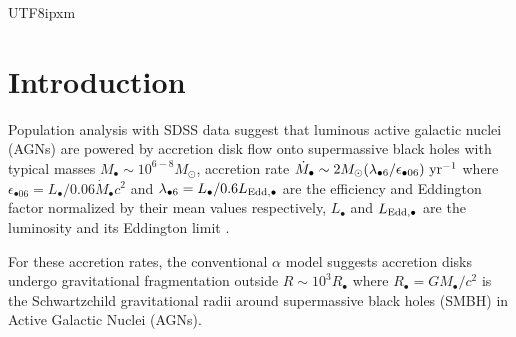 \documentclass[linenumbers,trackchanges]{aastex701}
\begin{document}
\begin{CJK*}{UTF8}{ipxm}
\section{Introduction}
Population analysis with SDSS data \citep{shankar2009}
suggest that luminous active galactic nuclei (AGNs) are powered
by accretion disk flow onto supermassive black holes \citep{lyndenbell1969}
with typical masses $M_\bullet \sim 10^{6-8} M_\odot$,
accretion rate ${\dot M}_\bullet \sim 2 M_\odot 
(\lambda_{\bullet 6} / \epsilon_{\bullet 06}) 
\ {\rm yr}^{-1}$ where $\epsilon_{\bullet 06} 
= L_\bullet/0.06 {\dot M}_\bullet c^2$  and 
$\lambda_{\bullet 6} =  L_\bullet/0.6 L_{\rm Edd, \bullet}$ 
are the efficiency and Eddington factor normalized by
their mean values respectively, $L_\bullet$ 
and $L_{\rm Edd, \bullet}$ are the luminosity and its 
Eddington limit \citep{yu2002, marconi2004}.

For these accretion rates, the conventional $\alpha$
model\citep{shakura1973} suggests accretion disks 
undergo gravitational fragmentation 
\citep{goodman2003, chen2023}
outside $R \sim 10^3 R_\bullet$ where $R_\bullet = G M_\bullet/c^2$ is the Schwartzchild 
gravitational radii around supermassive black holes 
(SMBH) in Active Galactic Nuclei (AGNs).


\end{CJK*}
\end{document}

